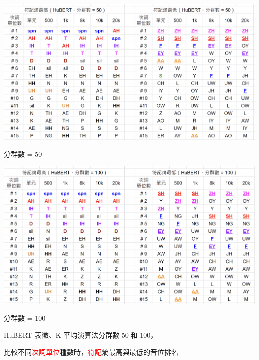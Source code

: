     {
        \begin{table}
            \centering
            \begin{subtable}{\textwidth}
                \centering
                \includegraphics[width=1\linewidth]{figures/ch4figs/phnrank-hub50pcs.png}
                \caption{分群數 = 50}
                \label{fig:hub-u050-phnrank-hub50pcs}
            \end{subtable}
            \vfill
            \begin{subtable}{\textwidth}
                \centering
                \includegraphics[width=1\linewidth]{figures/ch4figs/phnrank-hub100pcs.png}
                \caption{分群數 = 100}
                \label{fig:hub-u050-phnrank-hub100pcs}
            \end{subtable}
    
            \caption{HuBERT 表徵、K-平均演算法分群數 50 和 100，}
            比較不同\textcolor{red}{次詞單位}種數時，\textcolor{red}{符記}熵最高與最低的音位排名
            \label{fig:hub-u050-phnrank}
        \end{table}
    }

